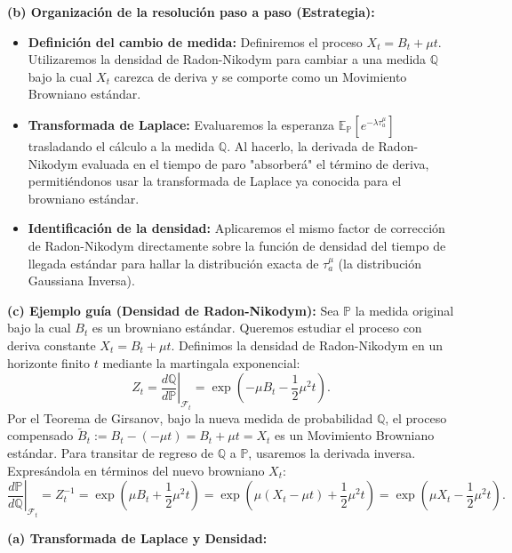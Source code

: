 \documentclass[11pt, letterpaper]{article}
\begin{document}
\begin{solucion}
    \textbf{(b) Organización de la resolución paso a paso (Estrategia):}
    \begin{itemize}
        \item[(i)] \textbf{Definición del cambio de medida:} Definiremos el proceso $X_t = B_t + \mu t$. Utilizaremos la densidad de Radon-Nikodym para cambiar a una medida $\mathbb{Q}$ bajo la cual $X_t$ carezca de deriva y se comporte como un Movimiento Browniano estándar.
        \item[(ii)] \textbf{Transformada de Laplace:} Evaluaremos la esperanza $\mathbb{E}_{\mathbb{P}}[e^{-\lambda \tau_a^\mu}]$ trasladando el cálculo a la medida $\mathbb{Q}$. Al hacerlo, la derivada de Radon-Nikodym evaluada en el tiempo de paro "absorberá" el término de deriva, permitiéndonos usar la transformada de Laplace ya conocida para el browniano estándar.
        \item[(iii)] \textbf{Identificación de la densidad:} Aplicaremos el mismo factor de corrección de Radon-Nikodym directamente sobre la función de densidad del tiempo de llegada estándar para hallar la distribución exacta de $\tau_a^\mu$ (la distribución Gaussiana Inversa).
    \end{itemize}

    \vspace{3mm}
    \textbf{(c) Ejemplo guía (Densidad de Radon-Nikodym):}
    Sea $\mathbb{P}$ la medida original bajo la cual $B_t$ es un browniano estándar. Queremos estudiar el proceso con deriva constante $X_t = B_t + \mu t$.
    Definimos la densidad de Radon-Nikodym en un horizonte finito $t$ mediante la martingala exponencial:
    \[ Z_t = \left.\frac{d\mathbb{Q}}{d\mathbb{P}}\right|_{\mathcal{F}_t} = \exp\left( -\mu B_t - \frac{1}{2}\mu^2 t \right). \]
    Por el Teorema de Girsanov, bajo la nueva medida de probabilidad $\mathbb{Q}$, el proceso compensado $\tilde{B}_t := B_t - (-\mu t) = B_t + \mu t = X_t$ es un Movimiento Browniano estándar.
    Para transitar de regreso de $\mathbb{Q}$ a $\mathbb{P}$, usaremos la derivada inversa. Expresándola en términos del nuevo browniano $X_t$:
    \[ \left.\frac{d\mathbb{P}}{d\mathbb{Q}}\right|_{\mathcal{F}_t} = Z_t^{-1} = \exp\left( \mu B_t + \frac{1}{2}\mu^2 t \right) = \exp\left( \mu(X_t - \mu t) + \frac{1}{2}\mu^2 t \right) = \exp\left( \mu X_t - \frac{1}{2}\mu^2 t \right). \]

    \vspace{3mm}
    \textbf{(a) Transformada de Laplace y Densidad:}


\end{solucion}
\end{document}
